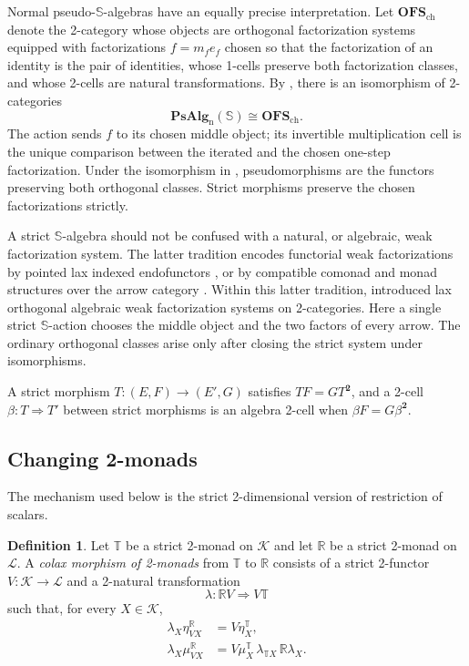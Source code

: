 \documentclass[11pt]{article}
\theoremstyle{plain}
\theoremstyle{definition}
\newtheorem{definition}[theorem]{Definition}
\theoremstyle{remark}
\newcommand{\PsAlg}{\mathbf{PsAlg}}
\newcommand{\OFSch}{\mathbf{OFS}_{\mathrm{ch}}}
\newcommand{\Sq}{\mathbb{S}}
\numberwithin{equation}{section}
\begin{document}
Normal pseudo-$\Sq$-algebras have an equally precise interpretation.
Let $\OFSch$ denote the 2-category whose objects are orthogonal
factorization systems equipped with factorizations
$f=m_fe_f$ chosen so that the factorization of an identity is the pair
of identities, whose 1-cells preserve both factorization classes, and
whose 2-cells are natural transformations.  By
\citet[Theorem~2.4]{KorostenskiTholen1993}, there is an isomorphism of
2-categories
\begin{equation}
  \PsAlg_{\mathrm n}(\Sq)\cong\OFSch.
  \label{eq:sq-pseudo-OFS}
\end{equation}
The action sends $f$ to its chosen middle object; its invertible
multiplication cell is the unique comparison between the iterated and
the chosen one-step factorization.  Under
the isomorphism in , pseudomorphisms are the functors
preserving both orthogonal classes.  Strict morphisms preserve the
chosen factorizations strictly.

A strict $\Sq$-algebra should not be confused with a natural, or
algebraic, weak factorization system.  The latter tradition encodes
functorial weak factorizations by pointed lax indexed endofunctors
\citep{JanelidzeTholen1999}, or by compatible comonad and monad
structures over the arrow category \citep{GrandisTholen2006}.  Within
this latter tradition, \citet{ClementinoLopezFranco2016} introduced lax
orthogonal algebraic weak factorization systems on 2-categories.  Here a
single strict $\Sq$-action chooses the middle object and the two factors
of every arrow.  The ordinary orthogonal classes arise only after
closing the strict system under isomorphisms.

A strict morphism $T\colon(E,F)\to(E',G)$ satisfies
$TF=GT^{\mathbf 2}$, and a 2-cell $\beta\colon T\Rightarrow T'$ between
strict morphisms is an algebra 2-cell when
$\beta F=G\beta^{\mathbf 2}$.

\subsection{Changing 2-monads}

The mechanism used below is the strict 2-dimensional version of
restriction of scalars.

\begin{definition}\label{def:colax-monad-morphism}
Let $\mathbb T$ be a strict 2-monad on $\mathcal K$ and let
$\mathbb R$ be a strict 2-monad on $\mathcal L$.  A \emph{colax
morphism of 2-monads} from $\mathbb T$ to $\mathbb R$ consists of a
strict 2-functor $V\colon\mathcal K\to\mathcal L$ and a 2-natural
transformation
\begin{equation*}
  \lambda\colon\mathbb R V\Longrightarrow V\mathbb T
\end{equation*}
such that, for every $X\in\mathcal K$,
\begin{align}
  \lambda_X\eta^{\mathbb R}_{VX}
    &=V\eta^{\mathbb T}_X,
    \label{eq:general-monad-unit}\\
  \lambda_X\mu^{\mathbb R}_{VX}
    &=V\mu^{\mathbb T}_X\,
      \lambda_{\mathbb T X}\,
      \mathbb R\lambda_X.
    \label{eq:general-monad-multiplication}
\end{align}
\end{definition}
\end{document}
